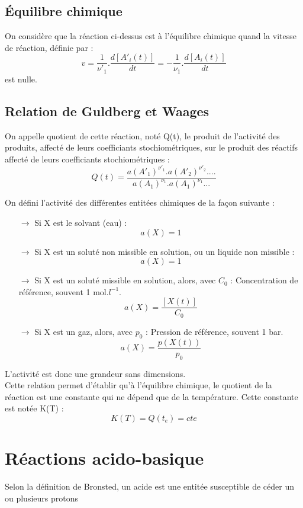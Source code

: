 \subsection{Équilibre chimique}
\begin{de} 
On considère que la réaction ci-dessus est à l'équilibre chimique quand la vitesse de réaction, définie par :
$$v = \dfrac{1}{\nu'_1}.\dfrac{d[A'_i(t)]}{dt} = -\dfrac{1}{\nu_1}.\dfrac{d[A_i(t)]}{dt}$$
est nulle.
\end{de}
\subsection{Relation de Guldberg et Waages}
\begin{de}
On appelle quotient de cette réaction, noté Q(t), le produit de l'activité des produits, affecté de leurs coefficiants stochiométriques, sur le produit des réactifs affecté de leurs coefficiants stochiométriques :
$$Q(t) = \dfrac{a(A'_1)^{\nu'_1}.a(A'_2)^{\nu'_2}....}{a(A_1)^{\nu_1}.a(A_1)^{\nu_1}...}$$ 
\end{de}
On défini l'activité des différentes entitées chimiques de la façon suivante :
\begin{itemize}
 \item[$\rightarrow$] Si X est le solvant (eau) : $$a(X) = 1$$
 \item[$\rightarrow$] Si X est un soluté non missible en solution, ou un liquide non missible : $$a(X) = 1$$
 \item[$\rightarrow$] Si X est un soluté missible en solution, alors, avec $C_0$ : Concentration de référence, souvent 1 mol.$l^{-1}$. $$a(X) = \dfrac{[X(t)]}{C_0}$$
 \item[$\rightarrow$] Si X est un gaz, alors, avec $p_0$ : Pression de référence, souvent 1 bar. $$a(X) = \dfrac{p(X(t))}{p_0}$$
\end{itemize}
L'activité est donc une grandeur sans dimensions.\\
Cette relation permet d'établir qu'à l'équilibre chimique, le quotient de la réaction est une constante qui ne dépend que de la température. Cette constante est notée K(T) : $$K(T)=Q(t_e)=cte$$
\section{Réactions acido-basique}
\begin{de}
Selon la définition de Bronsted, un acide est une entitée susceptible de céder un ou plusieurs protons
\end{de}
